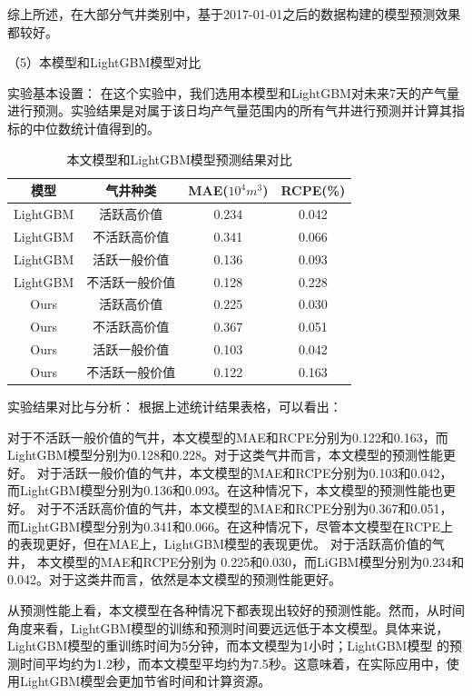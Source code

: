 综上所述，在大部分气井类别中，基于2017-01-01之后的数据构建的模型预测效果都较好。

（5）本模型和LightGBM模型对比

实验基本设置： 在这个实验中，我们选用本模型和LightGBM对未来7天的产气量进行预测。实验结果是对属于该日均产气量范围内的所有气井进行预测并计算其指标的中位数统计值得到的。
\begin{table}[H]
    \renewcommand{\arraystretch}{1.5}
    \centering
    \caption{本文模型和LightGBM模型预测结果对比}
    \label{tab:prediction_comparison}
    \begin{tabular}{|c|c|c|c|}
    \hline
    模型     & 气井种类 & MAE($10^4 m^3$) & RCPE(\%) \\ \hline
    LightGBM & 活跃高价值       &0.234            & 0.042 \\ \hline
    LightGBM & 不活跃高价值     & 0.341           & 0.066    \\ \hline
    LightGBM & 活跃一般价值      & 0.136           & 0.093    \\ \hline
    LightGBM & 不活跃一般价值      & 0.128           & 0.228    \\ \hline
    Ours      & 活跃高价值        &0.225            &0.030      \\ \hline
    Ours      & 不活跃高价值      & 0.367           & 0.051   \\ \hline
    Ours      & 活跃一般价值      & 0.103           & 0.042    \\ \hline
    Ours      &不活跃一般价值      & 0.122           & 0.163    \\ \hline
    \end{tabular}
\end{table}

实验结果对比与分析： 根据上述统计结果表格，可以看出：

对于不活跃一般价值的气井，本文模型的MAE和RCPE分别为0.122和0.163，而LightGBM模型分别为0.128和0.228。对于这类气井而言，本文模型的预测性能更好。
对于活跃一般价值的气井，本文模型的MAE和RCPE分别为0.103和0.042，而LightGBM模型分别为0.136和0.093。在这种情况下，本文模型的预测性能也更好。
对于不活跃高价值的气井，本文模型的MAE和RCPE分别为0.367和0.051，而LightGBM模型分别为0.341和0.066。在这种情况下，尽管本文模型在RCPE上的表现更好，但在MAE上，LightGBM模型的表现更优。
对于活跃高价值的气井， 本文模型的MAE和RCPE分别为 0.225和0.030，而LiGBM模型分别为0.234和0.042。对于这类井而言，依然是本文模型的预测性能更好。

从预测性能上看，本文模型在各种情况下都表现出较好的预测性能。然而，从时间角度来看，LightGBM模型的训练和预测时间要远远低于本文模型。具体来说，LightGBM模型的重训练时间为5分钟，而本文模型为1小时；LightGBM模型
的预测时间平均约为1.2秒，而本文模型平均约为7.5秒。这意味着，在实际应用中，使用LightGBM模型会更加节省时间和计算资源。

